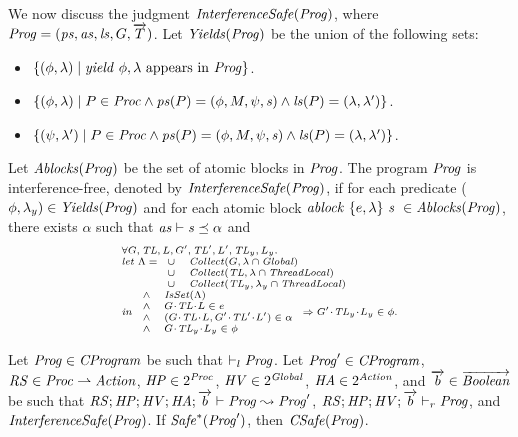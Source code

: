 We now discuss the judgment $\mathit{InterferenceSafe}(\mathit{Prog})$,
where $\mathit{Prog} = (\mathit{ps}, \mathit{as}, \mathit{ls}, G, \overrightarrow{T})$. 
Let $\mathit{Yields}(\mathit{Prog})$ be the union of the following sets:
\begin{itemize}
\item
$\{(\phi,\lambda) \mid \mathit{yield}\ \phi,\lambda~\mathrm{appears~in~\mathit{Prog}}\}$.
\item
$\{(\phi,\lambda) \mid P \in \mathit{Proc} \wedge \mathit{ps}(P) = (\phi, M, \psi, \mathit{s}) \wedge \mathit{ls}(P) = (\lambda,\lambda')\}$.
\item
$\{(\psi,\lambda') \mid P \in \mathit{Proc} \wedge \mathit{ps}(P) = (\phi, M, \psi, \mathit{s}) \wedge \mathit{ls}(P) = (\lambda,\lambda')\}$.
\end{itemize}
Let $\mathit{Ablocks}(\mathit{Prog})$ be the set of atomic blocks in $\mathit{Prog}$.
The program $\mathit{Prog}$ is interference-free, denoted by $\mathit{InterferenceSafe}(\mathit{Prog})$,
if for each predicate ($\phi,\lambda_y) \in \mathit{Yields}(\mathit{Prog})$ and 
for each atomic block $\mathit{ablock}\ {\{e,\lambda\}}\ {\mathit{s}}\  \in \mathit{Ablocks}(\mathit{Prog})$, there exists $\alpha$ such that 
$\mathit{as} \vdash \mathit{s} \preceq \alpha$ and 
\[
\scriptsize{
\begin{array}{l}
\forall \varsG,\varsTL,\varsL,\varsG',\varsTL',\varsL',\varsTL_y,\varsL_y.\\ 
\mathit{let}\ \Lambda =
\begin{array}[t]{ll}
\cup & \Collect(\varsG, \lins \cap \Global) \\
\cup & \Collect(\varsTL, \lins \cap \ThreadLocal) \\
\cup & \Collect(\varsTL_y, \lins_y \cap \ThreadLocal) 
\end{array} \\
\mathit{in}\
\begin{array}{ll}
\wedge & \IsSet(\Lambda) \\
\wedge & \MakeStore{\varsG}{\varsTL}{\varsL} \in e \\
\wedge & (\MakeStore{\varsG}{\varsTL}{\varsL}, \MakeStore{\varsG'}{\varsTL'}{\varsL'}) \in \alpha \\
\wedge & \MakeStore{\varsG}{\varsTL_y}{\varsL_y} \in \phi
\end{array}
\Rightarrow \MakeStore{\varsG'}{\varsTL_y}{\varsL_y} \in \phi.
\end{array}
}
\]

\begin{lemma}
Let $\mathit{Prog} \in \mathit{CProgram}$ be such that $\vdash_l \mathit{Prog}$.
Let $\mathit{Prog}' \in \mathit{CProgram}$, $\mathit{RS} \in \mathit{Proc} \rightharpoonup \mathit{Action}$, $\mathit{HP} \in 2^{\mathit{Proc}}$, $\mathit{HV} \in 2^{\mathit{Global}}$, $\mathit{HA} \in 2^{\mathit{Action}}$,
and $\overrightarrow{b} \in \overrightarrow{\mathit{Boolean}}$ be such that 
$\mathit{RS};\mathit{HP};\mathit{HV};\mathit{HA};\overrightarrow{b} \vdash \mathit{Prog} \leadsto \mathit{Prog}'$, $\mathit{RS};\mathit{HP};\mathit{HV};\overrightarrow{b} \vdash_r \mathit{Prog}$, and
$\mathit{InterferenceSafe}(\mathit{Prog})$.
If $\mathit{Safe}^*(\mathit{Prog}')$, then $\mathit{CSafe}(\mathit{Prog})$.
\end{lemma}


